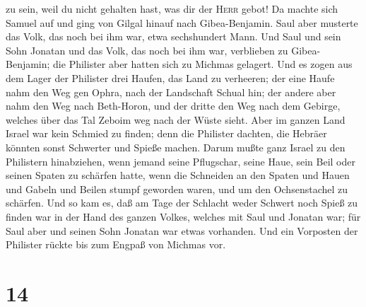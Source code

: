 zu sein, weil du nicht gehalten hast, was dir der \textsc{Herr} gebot!
 Da machte sich Samuel auf und ging von Gilgal hinauf
nach Gibea-Benjamin. Saul aber musterte das Volk, das noch bei ihm war,
etwa sechshundert Mann.  Und Saul und sein Sohn Jonatan
und das Volk, das noch bei ihm war, verblieben zu Gibea-Benjamin; die
Philister aber hatten sich zu Michmas gelagert.  Und es
zogen aus dem Lager der Philister drei Haufen, das Land zu verheeren;
der eine Haufe nahm den Weg gen Ophra, nach der Landschaft Schual hin;
 der andere aber nahm den Weg nach Beth-Horon, und der
dritte den Weg nach dem Gebirge, welches über das Tal Zeboim weg nach
der Wüste sieht.  Aber im ganzen Land Israel war kein
Schmied zu finden; denn die Philister dachten, die Hebräer könnten sonst
Schwerter und Spieße machen.  Darum mußte ganz Israel zu
den Philistern hinabziehen, wenn jemand seine Pflugschar, seine Haue,
sein Beil oder seinen Spaten zu schärfen hatte,  wenn die
Schneiden an den Spaten und Hauen und Gabeln und Beilen stumpf geworden
waren, und um den Ochsenstachel zu schärfen.  Und so kam
es, daß am Tage der Schlacht weder Schwert noch Spieß zu finden war in
der Hand des ganzen Volkes, welches mit Saul und Jonatan war; für Saul
aber und seinen Sohn Jonatan war etwas vorhanden.  Und
ein Vorposten der Philister rückte bis zum Engpaß von Michmas vor.

\hypertarget{section-13}{%
\section{14}\label{section-13}}

